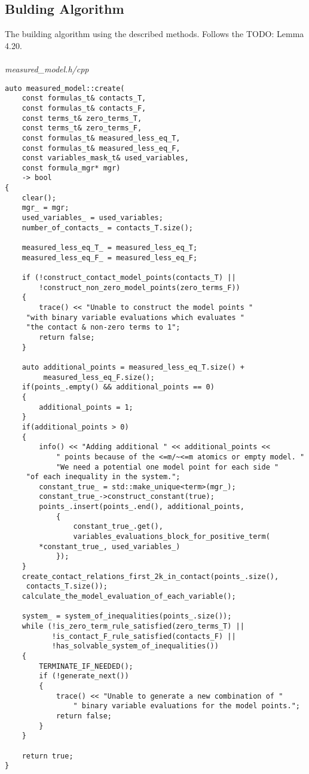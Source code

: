 \documentclass{article}
\begin{document}
	\subsection{Bulding Algorithm}
		The building algorithm using the described methods. Follows the TODO: Lemma 4.20.
\\
\\
\noindent
\textit{measured\_model.h/cpp}
\begin{lstlisting}
auto measured_model::create(
    const formulas_t& contacts_T,
    const formulas_t& contacts_F,
    const terms_t& zero_terms_T,
    const terms_t& zero_terms_F,
    const formulas_t& measured_less_eq_T,
    const formulas_t& measured_less_eq_F,
    const variables_mask_t& used_variables,
    const formula_mgr* mgr)
    -> bool
{
    clear();
    mgr_ = mgr;
    used_variables_ = used_variables;
    number_of_contacts_ = contacts_T.size();

    measured_less_eq_T_ = measured_less_eq_T;
    measured_less_eq_F_ = measured_less_eq_F;

    if (!construct_contact_model_points(contacts_T) ||
        !construct_non_zero_model_points(zero_terms_F))
    {
        trace() << "Unable to construct the model points "
	 "with binary variable evaluations which evaluates "
	 "the contact & non-zero terms to 1";
        return false;
    }

    auto additional_points = measured_less_eq_T.size() +
		 measured_less_eq_F.size();
    if(points_.empty() && additional_points == 0)
    {
        additional_points = 1;
    }
    if(additional_points > 0)
    {
        info() << "Adding additional " << additional_points <<
            " points because of the <=m/~<=m atomics or empty model. "
            "We need a potential one model point for each side "
	 "of each inequality in the system.";
        constant_true_ = std::make_unique<term>(mgr_);
        constant_true_->construct_constant(true);
        points_.insert(points_.end(), additional_points, 
            {
                constant_true_.get(),
                variables_evaluations_block_for_positive_term(
		*constant_true_, used_variables_)
            });
    }
    create_contact_relations_first_2k_in_contact(points_.size(),
	 contacts_T.size());
    calculate_the_model_evaluation_of_each_variable();

    system_ = system_of_inequalities(points_.size());
    while (!is_zero_term_rule_satisfied(zero_terms_T) ||
           !is_contact_F_rule_satisfied(contacts_F) ||
           !has_solvable_system_of_inequalities())
    {
        TERMINATE_IF_NEEDED();
        if (!generate_next())
        {
            trace() << "Unable to generate a new combination of " 
                " binary variable evaluations for the model points.";
            return false;
        }
    }

    return true;
}
\end{lstlisting}
\end{document}
